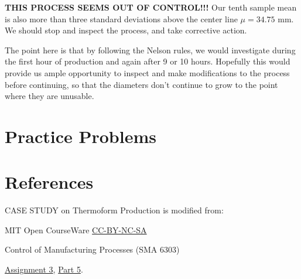 \documentclass{ximera}
\begin{document}
\textbf{THIS PROCESS SEEMS OUT OF CONTROL!!!}  Our tenth sample mean is also more than three standard deviations above the center line $\mu=34.75$ mm.  We should stop and inspect the process, and take corrective action.

The point here is that by following the Nelson rules, we would investigate during the first hour of production and again after 9 or 10 hours.  Hopefully this would provide us ample opportunity to inspect and make modifications to the process before continuing, so that the diameters don't continue to grow to the point where they are unusable.


\section*{Practice Problems}

\section*{References}
CASE STUDY on Thermoform Production is modified from:

MIT Open CourseWare \href{https://creativecommons.org/licenses/by-nc-sa/4.0/}{CC-BY-NC-SA}

Control of Manufacturing Processes (SMA 6303)

\href{https://ocw.mit.edu/courses/2-830j-control-of-manufacturing-processes-sma-6303-spring-2008/resources/ps3/}{Assignment 3}, \href{https://ocw.mit.edu/courses/2-830j-control-of-manufacturing-processes-sma-6303-spring-2008/resources/35/}{Part 5}. 
\end{document}
